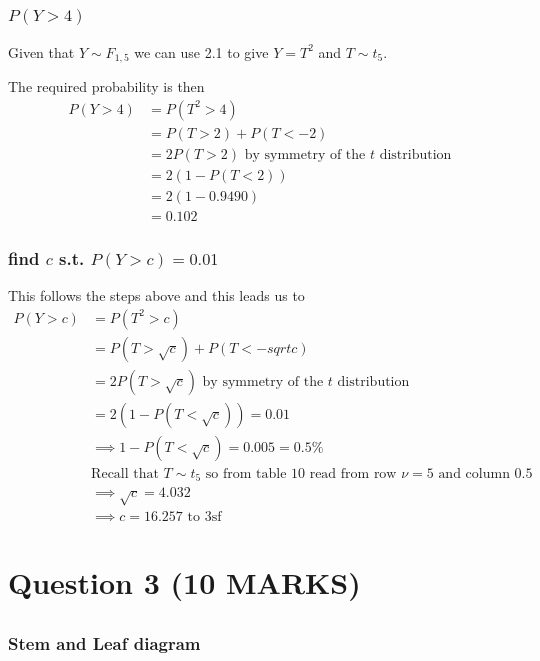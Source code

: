 \documentclass[11pt]{article}
\begin{document}
\subsection{}
\subsubsection{$P(Y>4)$}
Given that $Y \sim F_{1,5}$ we can use 2.1 to give $Y=T^{2}$ and $T \sim t_{5}$.

The required probability is then
\begin{align*}
  P(Y>4) &= P(T^{2}>4) \\
         &= P(T>2) + P(T<-2) \\
         &= 2P(T>2) \text{ by symmetry of the $t$ distribution} \\
         &= 2(1-P(T<2)) \\
         &= 2(1-0.9490)\\
         &= \boxed{0.102}
\end{align*}
\subsubsection{find $c$ s.t. $P(Y>c)=0.01$ }
This follows the steps above and this leads us to
\begin{align*}
  P(Y>c) &= P(T^{2}>c) \\
         &= P(T>\sqrt{c}) + P(T<-sqrt{c}) \\
         &= 2P(T>\sqrt{c}) \text{ by symmetry of the $t$ distribution} \\
         &= 2(1-P(T<\sqrt{c})) = 0.01\\
         &\implies 1- P(T<\sqrt{c}) = 0.005 = 0.5\% \\
         & \text{Recall that $T \sim t_{5}$ so from table 10 read from row $\nu=5$ and column $0.5$} \\
         &\implies \sqrt{c} = 4.032 \\
         &\implies \boxed{c=16.257 \text{ to 3sf} }
\end{align*}
\section{Question 3 (10 MARKS)}
\subsection{ }
\subsubsection{Stem and Leaf diagram}
\end{document}

